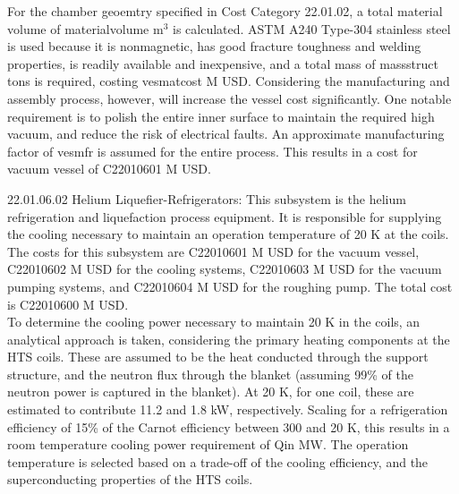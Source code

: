 For the chamber geoemtry specified in Cost Category 22.01.02, a total material volume of materialvolume m$^3$ is calculated. ASTM A240 Type-304 stainless steel is used because it is nonmagnetic, has good fracture toughness and welding properties, is readily available and inexpensive, and a total mass of massstruct tons is required, costing vesmatcost M USD. Considering the manufacturing and assembly process, however, will increase the vessel cost significantly. One notable requirement is to polish the entire inner surface to maintain the required high vacuum, and reduce the risk of electrical faults. An approximate manufacturing factor of vesmfr is assumed for the entire process. This results in a cost for vacuum vessel of C22010601 M USD.\\

\begin{table}[ht]
    \centering
    \caption{Vacuum vessel parameters.}
    \label{tab:ves_params}
\end{table}






22.01.06.02 Helium Liquefier-Refrigerators: This subsystem is the helium refrigeration and liquefaction process equipment. It is responsible for supplying the cooling necessary to maintain an operation temperature of 20 K at the coils. \\

The costs for this subsystem are C22010601 M USD for the vacuum vessel, C22010602 M USD for the cooling systems, C22010603 M USD for the vacuum pumping systems, and C22010604 M USD for the roughing pump. The total cost is C22010600 M USD.\\

To determine the cooling power necessary to maintain 20 K in the coils, an analytical approach is taken, considering the primary heating components at the HTS coils. These are assumed to be the heat conducted through the support structure, and the neutron flux through the blanket (assuming 99\% of the neutron power is captured in the blanket). At 20 K, for one coil, these are estimated to contribute 11.2 and 1.8 kW, respectively. Scaling for a refrigeration efficiency of 15\% of the Carnot efficiency between 300 and 20 K, this results in a room temperature cooling power requirement of Qin MW. The operation temperature is selected based on a trade-off of the cooling efficiency,
and the superconducting properties of the HTS coils.\\

